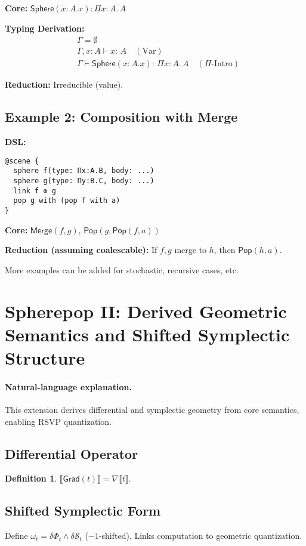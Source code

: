 \documentclass[12pt]{article}
\newcommand{\Entails}{\vdash}
\newcommand{\Types}{:\,}
\newcommand{\Sphere}{\mathsf{Sphere}}
\newcommand{\Pop}{\mathsf{Pop}}
\newcommand{\Merge}{\mathsf{Merge}}
\newcommand{\Ctx}{\Gamma}
\newcommand{\PiT}[3]{\Pi #1 : #2.\, #3}
\newcommand{\Interp}[1]{\llbracket #1 \rrbracket}
\newcommand{\Field}{\Phi}
\newcommand{\Entropy}{\mathcal{S}}
\theoremstyle{definition}
\newtheorem{definition}{Definition}
\begin{document}
\textbf{Core:}
$\Sphere(x:A.x) : \PiT{x}{A}{A}$

\textbf{Typing Derivation:}
\begin{align*}
&\Ctx = \emptyset \\
&\Ctx, x:A \Entails x \Types A \quad (\text{Var}) \\
&\Ctx \Entails \Sphere(x:A.x) \Types \PiT{x}{A}{A} \quad (\Pi\text{-Intro})
\end{align*}

\textbf{Reduction:} Irreducible (value).

\subsection{Example 2: Composition with Merge}
\textbf{DSL:}
\begin{verbatim}
@scene {
  sphere f(type: Πx:A.B, body: ...)
  sphere g(type: Πy:B.C, body: ...)
  link f ⊗ g
  pop g with (pop f with a)
}
\end{verbatim}

\textbf{Core:}
$\Merge(f,g)$, $\Pop(g, \Pop(f,a))$

\textbf{Reduction (assuming coalescable):}
If $f,g$ merge to $h$, then $\Pop(h,a)$.

More examples can be added for stochastic, recursive cases, etc.

\section{Spherepop II: Derived Geometric Semantics and Shifted Symplectic Structure}
\paragraph{Natural-language explanation.} This extension derives differential and symplectic geometry from core semantics, enabling RSVP quantization.

\subsection{Differential Operator}
\begin{definition}
$\Interp{\mathsf{Grad}(t)} = \nabla \Interp{t}$.
\end{definition}

\subsection{Shifted Symplectic Form}
Define $\omega_t = \delta\Field_t \wedge \delta\Entropy_t$ ($-1$-shifted). Links computation to geometric quantization.
\end{document}
